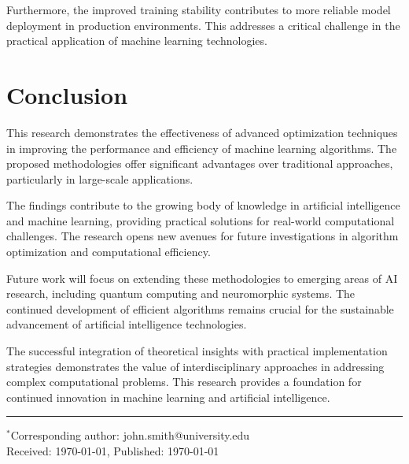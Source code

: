 \documentclass[twocolumn]{article}
\begin{document}
Furthermore, the improved training stability contributes to more reliable model deployment in production environments. This addresses a critical challenge in the practical application of machine learning technologies.

\section{Conclusion}

This research demonstrates the effectiveness of advanced optimization techniques in improving the performance and efficiency of machine learning algorithms. The proposed methodologies offer significant advantages over traditional approaches, particularly in large-scale applications.

The findings contribute to the growing body of knowledge in artificial intelligence and machine learning, providing practical solutions for real-world computational challenges. The research opens new avenues for future investigations in algorithm optimization and computational efficiency.

Future work will focus on extending these methodologies to emerging areas of AI research, including quantum computing and neuromorphic systems. The continued development of efficient algorithms remains crucial for the sustainable advancement of artificial intelligence technologies.

The successful integration of theoretical insights with practical implementation strategies demonstrates the value of interdisciplinary approaches in addressing complex computational problems. This research provides a foundation for continued innovation in machine learning and artificial intelligence.

\vspace{1cm}
\noindent\rule{\linewidth}{0.4pt}
\vspace{0.3cm}

{\small
$^{*}$Corresponding author: john.smith@university.edu \\
Received: \today, Published: \today
}
\end{document}
